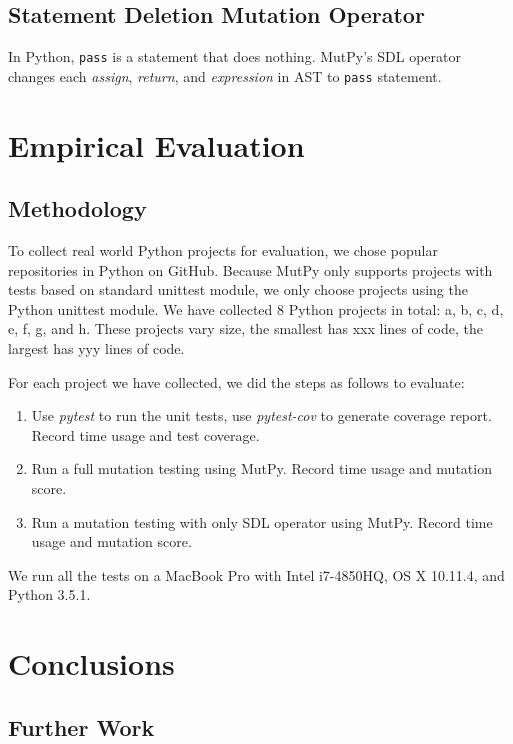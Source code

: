 \documentclass[12pt]{article}
\begin{document}
\subsection{Statement Deletion Mutation Operator}

In Python, \texttt{pass} is a statement that does nothing. MutPy's SDL operator changes each \emph{assign}, \emph{return}, and \emph{expression} in AST to \texttt{pass} statement.

\section{Empirical Evaluation}

\subsection{Methodology}

To collect real world Python projects for evaluation, we chose popular repositories in Python on GitHub. Because MutPy only supports projects with tests based on standard unittest module, we only choose projects using the Python unittest module. We have collected 8 Python projects in total: a, b, c, d, e, f, g, and h. These projects vary size, the smallest has xxx lines of code, the largest has yyy lines of code.

For each project we have collected, we did the steps as follows to evaluate:

\begin{enumerate}
  \item Use \emph{pytest} \cite{pytest} to run the unit tests, use \emph{pytest-cov} \cite{pytest-cov} to generate coverage report. Record time usage and test coverage.
  \item Run a full mutation testing using MutPy. Record time usage and mutation score.
  \item Run a mutation testing with only SDL operator using MutPy. Record time usage and mutation score.
\end{enumerate}

We run all the tests on a MacBook Pro with Intel i7-4850HQ, OS X 10.11.4, and Python 3.5.1.

\section{Conclusions}

\subsection{Further Work}
\end{document}
